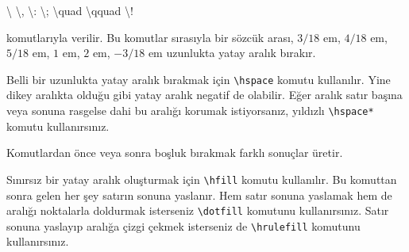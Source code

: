 \documentclass[
  letterpaper,
  DIV=11,
  numbers=noendperiod]{scrreprt}
\newenvironment{Shaded}{\begin{snugshade}}{\end{snugshade}}
\newcommand{\FunctionTok}[1]{\textcolor[rgb]{0.28,0.35,0.67}{#1}}
\begin{document}
\begin{Shaded}
\begin{Highlighting}[]
\FunctionTok{\textbackslash{} } \FunctionTok{\textbackslash{},}  \FunctionTok{\textbackslash{}:}  \FunctionTok{\textbackslash{};}  \FunctionTok{\textbackslash{}quad}  \FunctionTok{\textbackslash{}qquad}  \FunctionTok{\textbackslash{}!}
\end{Highlighting}
\end{Shaded}

komutlarıyla verilir. Bu komutlar sırasıyla bir sözcük arası, \(3/\!18\)
em, \(4/\!18\) em, \(5/\!18\) em, \(1\) em, \(2\) em, \(-3/\!18\) em
uzunlukta yatay aralık bırakır.

Belli bir uzunlukta yatay aralık bırakmak için
\texttt{\textbackslash{}hspace} komutu kullanılır. Yine dikey aralıkta
olduğu gibi yatay aralık negatif de olabilir. Eğer aralık satır başına
veya sonuna rasgelse dahi bu aralığı korumak istiyorsanız, yıldızlı
\texttt{\textbackslash{}hspace*} komutu kullanırsınız.

Komutlardan önce veya sonra boşluk bırakmak farklı sonuçlar üretir.

Sınırsız bir yatay aralık oluşturmak için \texttt{\textbackslash{}hfill}
komutu kullanılır. Bu komuttan sonra gelen her şey satırın sonuna
yaslanır. Hem satır sonuna yaslamak hem de aralığı noktalarla doldurmak
isterseniz \texttt{\textbackslash{}dotfill} komutunu kullanırsınız.
Satır sonuna yaslayıp aralığa çizgi çekmek isterseniz de
\texttt{\textbackslash{}hrulefill} komutunu kullanırsınız.
\end{document}
